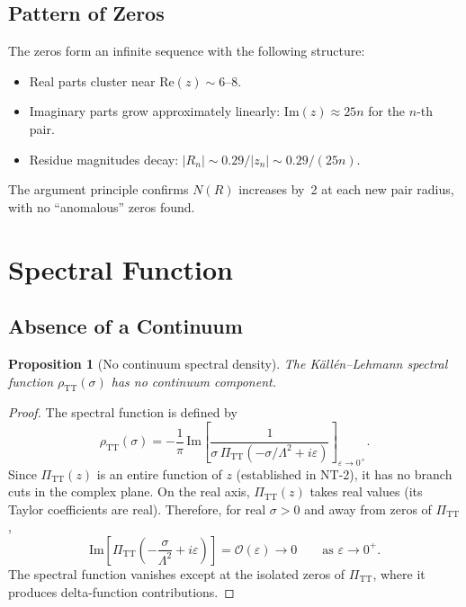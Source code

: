 \documentclass[11pt,a4paper]{article}
\newcommand{\PiTT}{\Pi_{\mathrm{TT}}}
\newcommand{\order}{\mathcal{O}}
\newtheorem{proposition}[theorem]{Proposition}
\begin{document}
\subsection{Pattern of Zeros}

The zeros form an infinite sequence with the following structure:
\begin{itemize}[nosep]
  \item Real parts cluster near $\mathrm{Re}(z) \sim 6$--$8$.
  \item Imaginary parts grow approximately linearly:
    $\mathrm{Im}(z) \approx 25n$ for the $n$-th pair.
  \item Residue magnitudes decay:
    $|R_n| \sim 0.29/|z_n| \sim 0.29/(25n)$.
\end{itemize}
The argument principle confirms $N(R)$ increases by~2 at each new pair
radius, with no ``anomalous'' zeros found.


\section{Spectral Function}
\label{sec:spectral}

\subsection{Absence of a Continuum}

\begin{proposition}[No continuum spectral density]
\label{prop:no-continuum}
The K\"all\'en--Lehmann spectral function $\rho_{\mathrm{TT}}(\sigma)$
has no continuum component.
\end{proposition}

\begin{proof}
The spectral function is defined by
\begin{equation}\label{eq:rho-def}
  \rho_{\mathrm{TT}}(\sigma)
  = -\frac{1}{\pi}\,\mathrm{Im}\!\left[
    \frac{1}{\sigma\,\PiTT(-\sigma/\Lambda^2 + i\varepsilon)}
  \right]_{\varepsilon \to 0^+}.
\end{equation}
Since $\PiTT(z)$ is an entire function of $z$ (established in NT-2),
it has no branch cuts in the complex plane.  On the real axis,
$\PiTT(z)$ takes real values (its Taylor coefficients are real).
Therefore, for real $\sigma > 0$ and away from zeros of $\PiTT$,
\begin{equation}
  \mathrm{Im}\!\left[\PiTT\!\left(-\frac{\sigma}{\Lambda^2}
    + i\varepsilon\right)\right]
  = \order(\varepsilon) \to 0
  \qquad \text{as } \varepsilon \to 0^+.
\end{equation}
The spectral function vanishes except at the isolated zeros of $\PiTT$,
where it produces delta-function contributions.
\end{proof}
\end{document}
